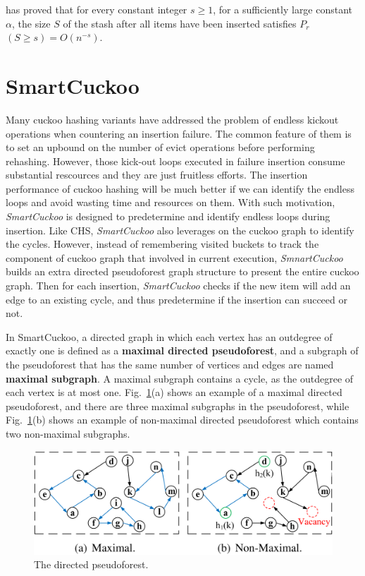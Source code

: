 \documentclass[12pt,conference,compsoc]{IEEEtran}
\begin{document}
\cite{CHS} has proved that for every constant integer $s\geq 1$, for a sufficiently large constant $\alpha$, the size $S$ of the stash after all items have been inserted satisfies \textbf{$P_r$}$(S\geq s)=O(n^{-s})$.


\section{SmartCuckoo}
\label{sec:smart}
Many cuckoo hashing variants have addressed the problem of endless kickout operations when countering an insertion failure. The common feature of them is to set an upbound on the number of evict operations before performing rehashing. However, those kick-out loops executed in failure insertion consume substantial rescources and they are just fruitless efforts. The insertion performance of cuckoo hashing will be much better if we can identify the endless loops and avoid wasting time and resources on them. With such motivation, \textit{SmartCuckoo} is designed to predetermine and identify endless loops during insertion. Like CHS, \textit{SmartCuckoo} also leverages on the cuckoo graph to identify the cycles. However, instead of remembering visited buckets to track the component of cuckoo graph that involved in current execution, \textit{SmnartCuckoo} builds an extra directed pseudoforest graph structure to present the entire cuckoo graph. Then for each insertion, \textit{SmartCuckoo} checks if the new item will add an edge to an existing cycle, and thus predetermine if the insertion can succeed or not.

In SmartCuckoo, a directed graph in which each vertex has an outdegree of exactly one is defined as a \textbf{maximal directed pseudoforest}, and a subgraph of the pseudoforest that has the same number of vertices and edges are named \textbf{maximal subgraph}. A maximal subgraph contains a cycle, as the outdegree of each vertex is at most one. Fig.~\ref{fig:maximal-graph}(a) shows an example of a maximal directed pseudoforest, and there are three maximal subgraphs in the pseudoforest, while Fig.~\ref{fig:maximal-graph}(b) shows an example of non-maximal directed pseudoforest which contains two non-maximal subgraphs. 

\begin{figure}
    \centering
    \includegraphics[width=\linewidth]{maximal-graph.png}
    \caption{The directed pseudoforest.} \label{fig:maximal-graph}
\end{figure}
\end{document}
